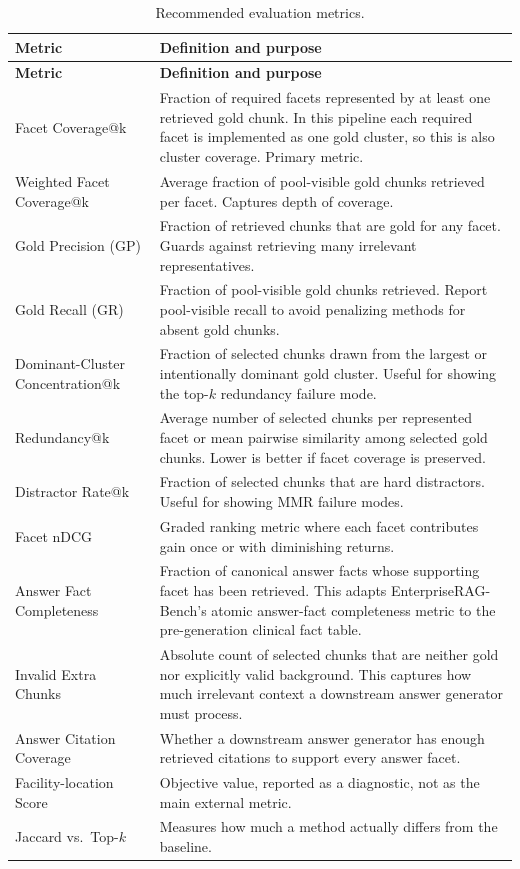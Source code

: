 \documentclass[11pt,a4paper]{article}
\begin{document}
\begin{longtable}{p{4cm}p{10.9cm}}
	\caption{Recommended evaluation metrics.}\\
	\toprule
	\textbf{Metric} & \textbf{Definition and purpose}\\
	\midrule
	\endfirsthead
	\toprule
	\textbf{Metric} & \textbf{Definition and purpose}\\
	\midrule
	\endhead
	\bottomrule
	\endfoot
	Facet Coverage@k & Fraction of required facets represented by at least one retrieved gold chunk. In this pipeline each required facet is implemented as one gold cluster, so this is also cluster coverage. Primary metric.\\
	Weighted Facet Coverage@k & Average fraction of pool-visible gold chunks retrieved per facet. Captures depth of coverage.\\
	Gold Precision (GP) & Fraction of retrieved chunks that are gold for any facet. Guards against retrieving many irrelevant representatives.\\
	Gold Recall (GR) & Fraction of pool-visible gold chunks retrieved. Report pool-visible recall to avoid penalizing methods for absent gold chunks.\\
	Dominant-Cluster Concentration@k & Fraction of selected chunks drawn from the largest or intentionally dominant gold cluster. Useful for showing the top-$k$ redundancy failure mode.\\
	Redundancy@k & Average number of selected chunks per represented facet or mean pairwise similarity among selected gold chunks. Lower is better if facet coverage is preserved.\\
	Distractor Rate@k & Fraction of selected chunks that are hard distractors. Useful for showing MMR failure modes.\\
	Facet nDCG & Graded ranking metric where each facet contributes gain once or with diminishing returns.\\
	Answer Fact Completeness & Fraction of canonical answer facts whose supporting facet has been retrieved. This adapts EnterpriseRAG-Bench's atomic answer-fact completeness metric to the pre-generation clinical fact table.\\
	Invalid Extra Chunks & Absolute count of selected chunks that are neither gold nor explicitly valid background. This captures how much irrelevant context a downstream answer generator must process.\\
	Answer Citation Coverage & Whether a downstream answer generator has enough retrieved citations to support every answer facet.\\
	Facility-location Score & Objective value, reported as a diagnostic, not as the main external metric.\\
	Jaccard vs.\ Top-$k$ & Measures how much a method actually differs from the baseline.\\
\end{longtable}
\end{document}
